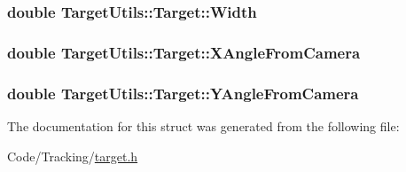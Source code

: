 \hypertarget{struct_target_utils_1_1_target_acc71a9dd1ebdcc7fb60df9beeaa85cba}{
\subsubsection[{\-Width}]{\setlength{\rightskip}{0pt plus 5cm}double {\bf \-Target\-Utils\-::\-Target\-::\-Width}}}\label{struct_target_utils_1_1_target_acc71a9dd1ebdcc7fb60df9beeaa85cba}
\hypertarget{struct_target_utils_1_1_target_a7c9329af80c304ba48e5752d12562773}{
\subsubsection[{\-X\-Angle\-From\-Camera}]{\setlength{\rightskip}{0pt plus 5cm}double {\bf \-Target\-Utils\-::\-Target\-::\-X\-Angle\-From\-Camera}}}\label{struct_target_utils_1_1_target_a7c9329af80c304ba48e5752d12562773}
\hypertarget{struct_target_utils_1_1_target_a9492565f66be784c272076bde727223d}{
\subsubsection[{\-Y\-Angle\-From\-Camera}]{\setlength{\rightskip}{0pt plus 5cm}double {\bf \-Target\-Utils\-::\-Target\-::\-Y\-Angle\-From\-Camera}}}\label{struct_target_utils_1_1_target_a9492565f66be784c272076bde727223d}


\-The documentation for this struct was generated from the following file\-:\begin{DoxyCompactItemize}
\item 
\-Code/\-Tracking/\hyperlink{target_8h}{target.\-h}\end{DoxyCompactItemize}
